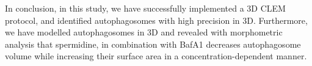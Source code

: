 In conclusion, in this study, we have successfully implemented a 3D CLEM protocol, and identified autophagosomes with high precision in 3D. Furthermore, we have modelled autophagosomes in 3D and revealed with morphometric analysis that spermidine, in combination with BafA1 decreases autophagosome volume while increasing their surface area in a concentration-dependent manner. 

